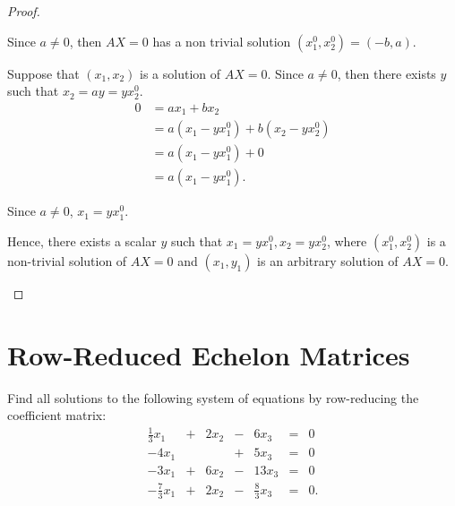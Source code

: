 \begin{proof}
\begin{enumerate}[label={(\alph*)}]
              Since $a\ne 0$, then $AX = 0$ has a non trivial solution $({x}^{0}_{1}, {x}^{0}_{2}) = (-b, a)$.

              Suppose that $(x_{1}, x_{2})$ is a solution of $AX = 0$. Since $a\ne 0$, then there exists $y$ such that $x_{2} = ay = y{x}^{0}_{2}$.
              \begin{align*}
                  0 & = a{x}_{1} + b{x}_{2}                                   \\
                    & = a({x}_{1} - y{x}^{0}_{1}) + b({x}_{2} - y{x}^{0}_{2}) \\
                    & = a({x}_{1} - y{x}^{0}_{1}) + 0                         \\
                    & = a({x}_{1} - y{x}^{0}_{1}).
              \end{align*}

              Since $a\ne 0$, ${x}_{1} = y{x}^{0}_{1}$.

              Hence, there exists a scalar $y$ such that $x_{1} = y{x}^{0}_{1}, x_{2} = y{x}^{0}_{2}$, where $({x}^{0}_{1}, {x}^{0}_{2})$ is a non-trivial solution of $AX = 0$ and $(x_{1}, y_{1})$ is an arbitrary solution of $AX = 0$.
    \end{enumerate}
\end{proof}

\section{Row-Reduced Echelon Matrices}

\setcounter{exercise}{0}

\begin{exercise}
    Find all solutions to the following system of equations by row-reducing the coefficient matrix:
    \[
        \begin{array}{ccccccc}
            \frac{1}{3}{x}_{1}  & + & 2{x}_{2} & - & 6{x}_{3}         & = & 0  \\
            -4{x}_{1}           &   &          & + & 5{x}_{3}         & = & 0  \\
            -3{x}_{1}           & + & 6{x}_{2} & - & 13{x}_{3}        & = & 0  \\
            -\frac{7}{3}{x}_{1} & + & 2{x}_{2} & - & \frac{8}{3}x_{3} & = & 0.
        \end{array}
    \]
\end{exercise}

